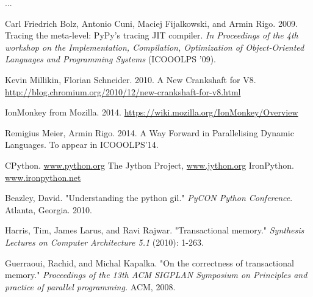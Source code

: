 \documentclass{sigplanconf}
\begin{document}


\acks
...






\begin{thebibliography}{}
\softraggedright

 Carl Friedrich Bolz, Antonio Cuni, Maciej
  Fijalkowski, and Armin Rigo. 2009. Tracing the meta-level: PyPy's
  tracing JIT compiler.  \emph{In Proceedings of the 4th workshop on the
    Implementation, Compilation, Optimization of Object-Oriented Languages
    and Programming Systems} (ICOOOLPS '09).

 Kevin Millikin, Florian Schneider. 2010.  A New
  Crankshaft for V8.
  \url{http://blog.chromium.org/2010/12/new-crankshaft-for-v8.html}

 IonMonkey from Mozilla. 2014.
  \url{https://wiki.mozilla.org/IonMonkey/Overview}

 Remigius Meier, Armin Rigo. 2014. A Way Forward
  in Parallelising Dynamic Languages. To appear in ICOOOLPS'14.

 CPython. \url{www.python.org}
 The Jython Project, \url{www.jython.org}
 IronPython. \url{www.ironpython.net}

 Beazley, David. "Understanding the python gil."
  \emph{PyCON Python Conference}. Atlanta, Georgia. 2010.

 Harris, Tim, James Larus, and Ravi
  Rajwar. "Transactional memory." \emph{Synthesis Lectures on Computer
  Architecture 5.1} (2010): 1-263.

 Guerraoui, Rachid, and Michal Kapalka. "On the
  correctness of transactional memory." \emph{Proceedings of the 13th
    ACM SIGPLAN Symposium on Principles and practice of parallel
    programming.} ACM, 2008.


\end{thebibliography}
\end{document}
